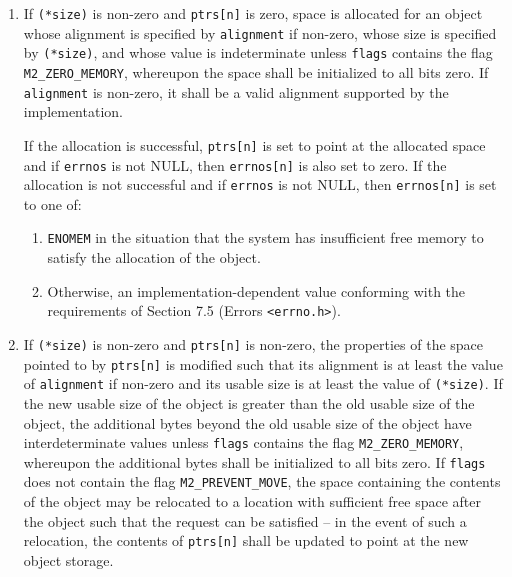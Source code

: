 \documentclass[wd]{isov2}
\begin{document}
{\begin{enumerate}
\begin{enumerate}
If the deallocation is successful, \texttt{ptrs[n]} is set to zero and if \texttt{errnos} is not NULL, then \texttt{errnos[n]} is also set to zero. If the deallocation is not successful, \texttt{ptrs[n]} is not modified and if \texttt{errnos} is not NULL, then \texttt{errnos[n]} is set to an implementation-dependent value conforming with the requirements of Section 7.5 (Errors \texttt{<errno.h>}).

\item If \texttt{(*size)} is non-zero and \texttt{ptrs[n]} is zero, space is allocated for an object whose alignment is specified by \texttt{alignment} if non-zero, whose size is specified by \texttt{(*size)}, and whose value is indeterminate unless \texttt{flags} contains the flag \texttt{M2\_ZERO\_MEMORY}, whereupon the space shall be initialized to all bits zero. If \texttt{alignment} is non-zero, it shall be a valid alignment supported by the implementation.

If the allocation is successful, \texttt{ptrs[n]} is set to point at the allocated space and if \texttt{errnos} is not NULL, then \texttt{errnos[n]} is also set to zero. If the allocation is not successful and if \texttt{errnos} is not NULL, then \texttt{errnos[n]} is set to one of:
\begin{enumerate}
\item \texttt{ENOMEM} in the situation that the system has insufficient free memory to satisfy the allocation of the object.
\item Otherwise, an implementation-dependent value conforming with the requirements of Section 7.5 (Errors \texttt{<errno.h>}).
\end{enumerate}

\item If \texttt{(*size)} is non-zero and \texttt{ptrs[n]} is non-zero, the properties of the space pointed to by \texttt{ptrs[n]} is modified such that its alignment is at least the value of \texttt{alignment} if non-zero and its usable size is at least the value of \texttt{(*size)}. If the new usable size of the object is greater than the old usable size of the object, the additional bytes beyond the old usable size of the object have interdeterminate values unless \texttt{flags} contains the flag \texttt{M2\_ZERO\_MEMORY}, whereupon the additional bytes shall be initialized to all bits zero. If \texttt{flags} does not contain the flag \texttt{M2\_PREVENT\_MOVE}, the space containing the contents of the object may be relocated to a location with sufficient free space after the object such that the request can be satisfied -- in the event of such a relocation, the contents of \texttt{ptrs[n]} shall be updated to point at the new object storage.


\end{enumerate}
\end{enumerate}}
\end{document}
